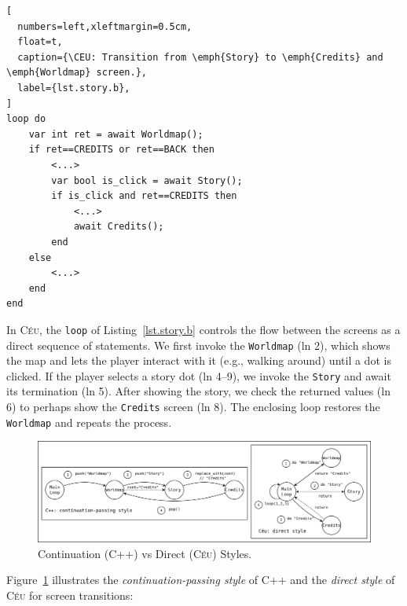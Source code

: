 \documentclass[10pt, conference, compsocconf]{IEEEtran}
\newcommand{\CEU}{\textsc{C\'{e}u}\xspace}
\newcommand{\code}[1] {{\small{\texttt{#1}}}}
\begin{document}
\begin{lstlisting}[
  numbers=left,xleftmargin=0.5cm,
  float=t,
  caption={\CEU: Transition from \emph{Story} to \emph{Credits} and \emph{Worldmap} screen.},
  label={lst.story.b},
]
loop do
    var int ret = await Worldmap();
    if ret==CREDITS or ret==BACK then
        <...>
        var bool is_click = await Story();
        if is_click and ret==CREDITS then
            <...>
            await Credits();
        end
    else
        <...>
    end
end
\end{lstlisting}

In \CEU, the \code{loop} of Listing~\ref{lst.story.b} controls the flow between
the screens as a direct sequence of statements.
%
We first invoke the \code{Worldmap} (ln 2), which shows the map and lets
the player interact with it (e.g., walking around) until a dot is clicked.
If the player selects a story dot (ln 4--9), we invoke the \code{Story}
and await its termination (ln 5).
After showing the story, we check the returned values (ln 6) to perhaps show
the \code{Credits} screen (ln 8).
The enclosing loop restores the \code{Worldmap} and repeats the process.

\begin{figure}
\centering
\includegraphics[width=\textwidth]{continuation}
\caption{ Continuation (C++) vs Direct (\CEU) Styles.
\label{fig.story}
}
\end{figure}

Figure~\ref{fig.story} illustrates the \emph{continuation-passing style} of
C++ and the \emph{direct style} of \CEU for screen transitions:
\end{document}
